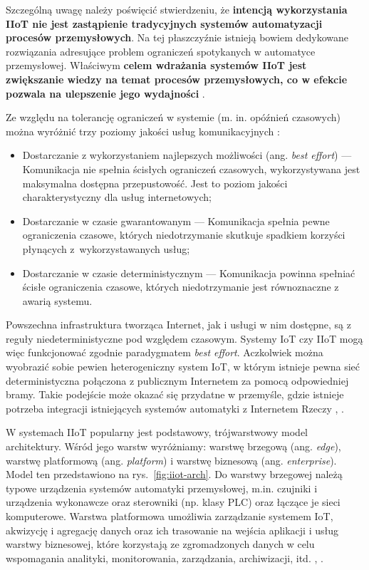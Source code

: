\documentclass[a4paper, 12pt, twoside]{article}
\begin{document}
Szczególną uwagę należy poświęcić stwierdzeniu, że \textbf{intencją wykorzystania IIoT nie
      jest zastąpienie tradycyjnych systemów automatyzacji procesów przemysłowych}.
Na tej płaszczyźnie istnieją bowiem dedykowane rozwiązania adresujące
problem ograniczeń spotykanych w automatyce przemysłowej.
Właściwym \textbf{celem wdrażania systemów IIoT jest zwiększanie wiedzy na temat procesów
      przemysłowych, co w efekcie pozwala na ulepszenie jego wydajności} \cite{iiot-challenges-opportunities-directions}.

Ze względu na tolerancję ograniczeń w systemie (m. in. opóźnień czasowych) można
wyróżnić trzy poziomy jakości usług komunikacyjnych \cite{iot-hype-to-reality}:
\begin{itemize}
      \itemsep0em
      \item Dostarczanie z wykorzystaniem najlepszych możliwości (ang. \emph{best effort})
            --- Komunikacja nie spełnia ścisłych ograniczeń czasowych, wykorzystywana jest
            maksymalna dostępna przepustowość. Jest to poziom jakości charakterystyczny
            dla usług internetowych;
      \item Dostarczanie w czasie gwarantowanym
            --- Komunikacja spełnia pewne ograniczenia czasowe, których niedotrzymanie
            skutkuje spadkiem korzyści płynących z~wykorzystawanych usług;
      \item Dostarczanie w czasie deterministycznym
            --- Komunikacja powinna spełniać ścisłe ograniczenia czasowe,
            których niedotrzymanie jest równoznaczne z awarią systemu.
\end{itemize}

Powszechna infrastruktura tworząca Internet, jak i usługi w nim dostępne, są z reguły
niedeterministyczne pod względem czasowym. Systemy IoT czy IIoT mogą więc
funkcjonować zgodnie paradygmatem \emph{best effort}. Aczkolwiek można wyobrazić
sobie pewien heterogeniczny system
IoT, w którym istnieje pewna sieć deterministyczna połączona z publicznym Internetem
za pomocą odpowiedniej bramy. Takie podejście może okazać się przydatne w przemyśle, gdzie
istnieje potrzeba integracji istniejących systemów automatyki z Internetem Rzeczy
\cite{iiot-design-and-impl-gateway}, \cite{iiot-rapid-integration-framework}.

W systemach IIoT popularny jest podstawowy, trójwarstwowy model architektury. Wśród jego
warstw wyróżniamy: warstwę brzegową (ang. \emph{edge}), warstwę platformową (ang. \emph{platform})
i warstwę biznesową (ang. \emph{enterprise}).
Model ten przedstawiono na rys.~\ref{fig:iiot-arch}. Do warstwy brzegowej należą
typowe urządzenia systemów automatyki przemysłowej, m.in. czujniki i urządzenia wykonawcze oraz
sterowniki (np. klasy PLC) oraz łączące je sieci komputerowe. Warstwa platformowa umożliwia zarządzanie
systemem IoT, akwizycję i agregację danych oraz ich trasowanie na wejścia
aplikacji i usług warstwy biznesowej, które
korzystają ze zgromadzonych danych w celu wspomagania
analityki, monitorowania, zarządzania, archiwizacji, itd. \cite{iiot-challenges-opportunities-directions},  \cite{models-innovative-iot}.
\end{document}
